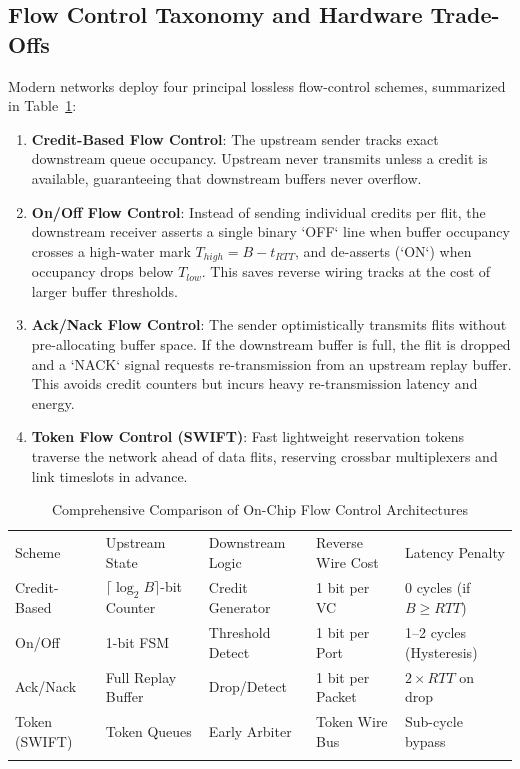 \subsection{Flow Control Taxonomy and Hardware Trade-Offs}
\label{subsec:ch2_taxonomy}

Modern networks deploy four principal lossless flow-control schemes, summarized in Table~\ref{tab:ch2_flow_control_taxonomy}:
\begin{enumerate}
    \item \textbf{Credit-Based Flow Control}: The upstream sender tracks exact downstream queue occupancy. Upstream never transmits unless a credit is available, guaranteeing that downstream buffers never overflow.
    \item \textbf{On/Off Flow Control}: Instead of sending individual credits per flit, the downstream receiver asserts a single binary `OFF` line when buffer occupancy crosses a high-water mark $T_{high} = B - t_{RTT}$, and de-asserts (`ON`) when occupancy drops below $T_{low}$. This saves reverse wiring tracks at the cost of larger buffer thresholds.
    \item \textbf{Ack/Nack Flow Control}: The sender optimistically transmits flits without pre-allocating buffer space. If the downstream buffer is full, the flit is dropped and a `NACK` signal requests re-transmission from an upstream replay buffer. This avoids credit counters but incurs heavy re-transmission latency and energy.
    \item \textbf{Token Flow Control (SWIFT)}: Fast lightweight reservation tokens traverse the network ahead of data flits, reserving crossbar multiplexers and link timeslots in advance.
\end{enumerate}

\begin{table}[t]
\caption{Comprehensive Comparison of On-Chip Flow Control Architectures}
\label{tab:ch2_flow_control_taxonomy}
\begin{tabular}{p{2.6cm}p{2.2cm}p{2.2cm}p{2.2cm}p{2.4cm}}
\hline\noalign{\smallskip}
Scheme & Upstream State & Downstream Logic & Reverse Wire Cost & Latency Penalty \\
\noalign{\smallskip}\svhline\noalign{\smallskip}
Credit-Based & $\lceil\log_2 B\rceil$-bit Counter & Credit Generator & 1 bit per VC & 0 cycles (if $B \ge RTT$) \\
On/Off & 1-bit FSM & Threshold Detect & 1 bit per Port & 1--2 cycles (Hysteresis) \\
Ack/Nack & Full Replay Buffer & Drop/Detect & 1 bit per Packet & $2 \times RTT$ on drop \\
Token (SWIFT) & Token Queues & Early Arbiter & Token Wire Bus & Sub-cycle bypass \\
\noalign{\smallskip}\hline\noalign{\smallskip}
\end{tabular}
\end{table}

